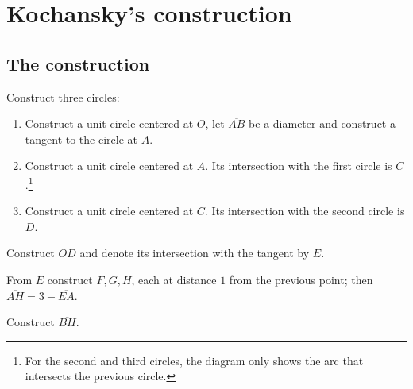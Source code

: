 \begin{center}
\end{center}

\newpage



\section{Kochansky's construction}

\subsection{The construction}

Construct three circles:
\begin{enumerate}
\item Construct a unit circle centered at $O$, let $\overline{AB}$ be a diameter and construct a tangent to the circle at $A$.
\item Construct a unit circle centered at $A$. Its intersection with the first circle is $C$.\footnote{For the second and third circles, the diagram only shows the arc that intersects the previous circle.}
\item Construct a unit circle centered at $C$. Its intersection with the second circle is $D$. 
\end{enumerate}
Construct $\overline{OD}$ and denote its intersection with the tangent by $E$.

From $E$ construct $F,G,H$, each at distance $1$ from the previous point; then $\overline{AH}=3-\overline{EA}$.

Construct $\overline{BH}$.

